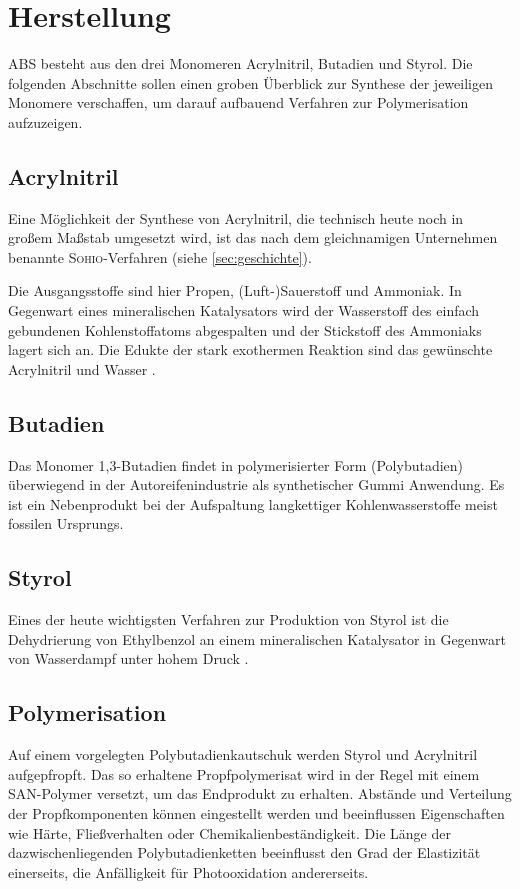     \section{Herstellung}
        ABS besteht aus den drei Monomeren Acrylnitril, Butadien und Styrol. Die folgenden Abschnitte sollen einen groben
        Überblick zur Synthese der jeweiligen Monomere verschaffen, um darauf aufbauend Verfahren zur Polymerisation aufzuzeigen.
        
        \subsection*{Acrylnitril}
            Eine Möglichkeit der Synthese von Acrylnitril, die technisch heute noch in großem Maßstab umgesetzt wird, ist das nach dem gleichnamigen
            Unternehmen benannte \textsc{Sohio}-Verfahren (siehe \cref{sec:geschichte}).

            Die Ausgangsstoffe sind hier Propen, (Luft-)Sauerstoff und Ammoniak. In Gegenwart eines mineralischen Katalysators wird der Wasserstoff
            des einfach gebundenen Kohlenstoffatoms abgespalten und der Stickstoff des Ammoniaks lagert sich an. Die Edukte der
            stark exothermen Reaktion sind das gewünschte Acrylnitril und Wasser \cite{sohio.process.patent.1959.9201957}.

        \subsection*{Butadien}
            Das Monomer 1,3-Butadien findet in polymerisierter Form (Polybutadien) überwiegend in der Autoreifenindustrie als synthetischer Gummi
            Anwendung. Es ist ein Nebenprodukt bei der Aufspaltung langkettiger Kohlenwasserstoffe meist fossilen Ursprungs.

        \subsection*{Styrol}
            Eines der heute wichtigsten Verfahren zur Produktion von Styrol ist die Dehydrierung von Ethylbenzol
            an einem mineralischen Katalysator in Gegenwart von Wasserdampf unter hohem Druck \cite{styrol.synthese.Liquid.Phase.Alkylation.of.Benzene.Bellussi.1995}.

        \subsection{Polymerisation}
            Auf einem vorgelegten Polybutadienkautschuk werden Styrol und Acrylnitril aufgepfropft. Das so erhaltene Propfpolymerisat
            wird in der Regel mit einem SAN-Polymer versetzt, um das Endprodukt zu erhalten. Abstände und Verteilung der
            Propfkomponenten können eingestellt werden und beeinflussen Eigenschaften wie Härte, Fließverhalten oder
            Chemikalienbeständigkeit. Die Länge der dazwischenliegenden Polybutadienketten beeinflusst den Grad der Elastizität
            einerseits, die Anfälligkeit für Photooxidation andererseits\cite{Domininghaus.1998.Kunststoffe.und.ihre.Eigenschaften}.
        
